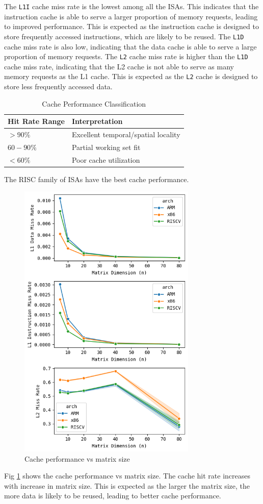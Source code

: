 The \texttt{L1I} cache miss rate is the lowest among all the ISAs. This indicates that the instruction cache is able to serve a larger proportion of memory requests, leading to improved performance. This is expected as the instruction cache is designed to store frequently accessed instructions, which are likely to be reused. The \texttt{L1D} cache miss rate is also low, indicating that the data cache is able to serve a large proportion of memory requests. The \texttt{L2} cache miss rate is higher than the \texttt{L1D} cache miss rate, indicating that the L2 cache is not able to serve as many memory requests as the L1 cache. This is expected as the \texttt{L2} cache is designed to store less frequently accessed data.

\begin{table}[H]
	\centering
    \caption{Cache Performance Classification}
	\begin{tabular}{ll}
		\toprule
		Hit Rate Range & Interpretation                      \\
		\midrule
		$>90\%$        & Excellent temporal/spatial locality \\
		$60-90\%$      & Partial working set fit             \\
		$<60\%$        & Poor cache utilization              \\
		\bottomrule
	\end{tabular}
	\label{tab:cache_class}
\end{table}

The RISC family of ISAs have the best cache performance.

\begin{figure}[H]
	\centering
	\includegraphics[width=8.5cm]{figs/dim_cache.png}
    \caption{Cache performance vs matrix size}
	\label{fig:dim_cache}
\end{figure}
Fig \ref{fig:dim_cache} shows the cache performance vs matrix size. The cache hit rate increases with increase in matrix size. This is expected as the larger the matrix size, the more data is likely to be reused, leading to better cache performance.